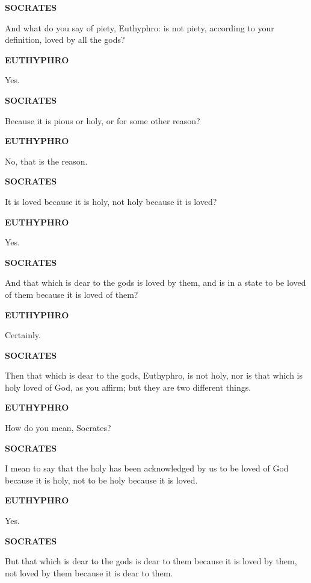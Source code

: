 \documentclass[11pt,letter]{article}
\begin{document}
\par \textbf{SOCRATES}
\par   And what do you say of piety, Euthyphro:  is not piety, according to your definition, loved by all the gods?

\par \textbf{EUTHYPHRO}
\par   Yes.

\par \textbf{SOCRATES}
\par   Because it is pious or holy, or for some other reason?

\par \textbf{EUTHYPHRO}
\par   No, that is the reason.

\par \textbf{SOCRATES}
\par   It is loved because it is holy, not holy because it is loved?

\par \textbf{EUTHYPHRO}
\par   Yes.

\par \textbf{SOCRATES}
\par   And that which is dear to the gods is loved by them, and is in a state to be loved of them because it is loved of them?

\par \textbf{EUTHYPHRO}
\par   Certainly.

\par \textbf{SOCRATES}
\par   Then that which is dear to the gods, Euthyphro, is not holy, nor is that which is holy loved of God, as you affirm; but they are two different things.

\par \textbf{EUTHYPHRO}
\par   How do you mean, Socrates?

\par \textbf{SOCRATES}
\par   I mean to say that the holy has been acknowledged by us to be loved of God because it is holy, not to be holy because it is loved.

\par \textbf{EUTHYPHRO}
\par   Yes.

\par \textbf{SOCRATES}
\par   But that which is dear to the gods is dear to them because it is loved by them, not loved by them because it is dear to them.
\end{document}
